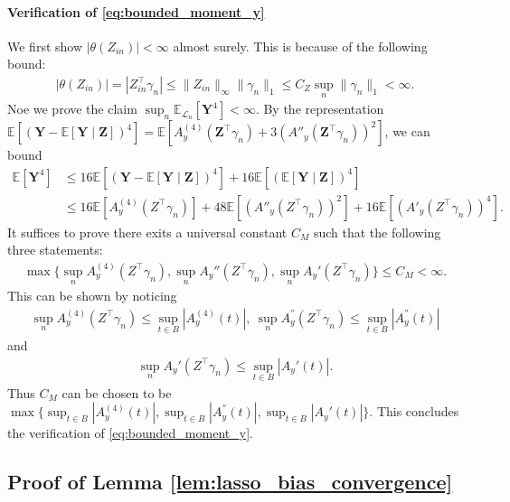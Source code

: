 \documentclass[12pt]{article}
\theoremstyle{definition}
\newcommand{\E}{\mathbb E}								%
\newcommand{\prz}{\bm Z}								%
\newcommand{\srz}{Z}									%
\newcommand{\pry}{{\bm Y}}								%
\newcommand{\law}{\mathcal L}							%
\begin{document}
\paragraph{Verification of \eqref{eq:bounded_moment_y}}

We first show $|\theta(\srz_{in})|<\infty$ almost surely. This is because of the following bound:
\begin{align*}
  |\theta(\srz_{in})|=|\srz_{in}^\top\gamma_n|\leq \|\srz_{in}\|_\infty\|\gamma_n\|_{1}\leq C_Z\sup_n\|\gamma_n\|_1<\infty.
\end{align*}
Noe we prove the claim $\sup_n\E_{\law_n}[\pry^4]<\infty$. By the representation $\E[(\pry-\E[\pry\mid \prz])^4]=\E[A^{(4)}_y(\prz^\top \gamma_n)+3(A''_y(\prz^\top \gamma_n))^2]$, we can bound
\begin{align*}
  \E[\pry^4]
  &
  \leq 16\E[(\pry-\E[\pry\mid \prz])^4]+16\E[(\E[\pry\mid \prz])^4]\\
  &
  \leq 16\E[A^{(4)}_y(\srz^\top \gamma_n)]+48\E[(A''_y(\srz^\top \gamma_n))^2]+16\E[(A'_y(\srz^\top \gamma_n))^4].
\end{align*}
It suffices to prove there exits a universal constant $C_M$ such that the following three statements:
\begin{align*}
  \max\{\sup_n A_y^{(4)}(\srz^\top \gamma_n), \sup_n A_y''(\srz^\top \gamma_n),\sup_n A_y'(\srz^\top \gamma_n)\}\leq C_M<\infty.
\end{align*}
This can be shown by noticing 
\begin{align*}
  \sup_n A_y^{(4)}(\srz^\top \gamma_n)\leq \sup_{t\in B}|A_y^{(4)}(t)|,\ \sup_n A_y^{''}(\srz^\top \gamma_n)\leq \sup_{t\in B}|A_y^{''}(t)|
\end{align*}
and 
\begin{align*}
  \sup_n A_y'(\srz^\top \gamma_n)\leq \sup_{t\in B}|A_y'(t)|.
\end{align*}
Thus $C_M$ can be chosen to be $\max\{\sup_{t\in B}|A_y^{(4)}(t)|,\sup_{t\in B}|A_y^{''}(t)|,\sup_{t\in B}|A_y'(t)|\}$. This concludes the verification of \eqref{eq:bounded_moment_y}.


\subsection{Proof of Lemma \ref{lem:lasso_bias_convergence}}
\end{document}
